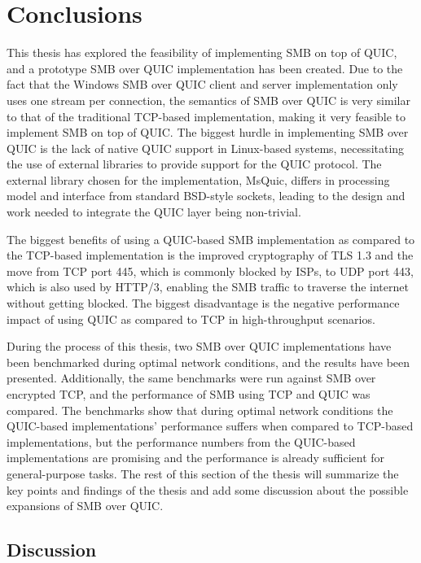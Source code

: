 \documentclass[english, 12pt, a4paper, elec, utf8, a-2b, online]{aaltothesis}
\begin{document}
\clearpage
\section{Conclusions}
\label{sec:conclusion}
\label{sec:summary}

This thesis has explored the feasibility of implementing SMB on top of QUIC,
and a prototype SMB over QUIC implementation has been created. Due to the fact that the
Windows SMB over QUIC client and server implementation only uses one stream per connection, the semantics of
SMB over QUIC is very similar to that of the traditional TCP-based implementation,
making it very feasible to implement SMB on top of QUIC.
The biggest hurdle in implementing SMB over QUIC is the lack of native QUIC support in Linux-based
systems, necessitating the use of external libraries to provide support for the QUIC protocol.
The external library chosen for the implementation, MsQuic, differs in processing model
and interface from standard BSD-style sockets, leading to the design and work needed to integrate
the QUIC layer being non-trivial.

The biggest benefits of using a QUIC-based SMB implementation as compared to the TCP-based implementation
is the improved cryptography of TLS 1.3 and the move from TCP port 445, which is commonly
blocked by ISPs, to UDP port 443, which is also used by HTTP/3, enabling the SMB
traffic to traverse the internet without getting blocked. The biggest disadvantage is
the negative performance impact of using QUIC as compared to TCP in high-throughput
scenarios.

During the process of this thesis, two SMB over QUIC implementations have been benchmarked
during optimal network conditions, and the results have been presented. Additionally,
the same benchmarks were run against SMB over encrypted TCP, and the performance of SMB
using TCP and QUIC was compared. The benchmarks show that during optimal network conditions
the QUIC-based implementations' performance suffers when compared to TCP-based implementations,
but the performance numbers from the QUIC-based implementations are promising and
the performance is already sufficient for general-purpose tasks. The rest of this section of the
thesis will summarize the key points and findings of the thesis
and add some discussion about the possible expansions of SMB over QUIC.

\subsection{Discussion}
\end{document}
